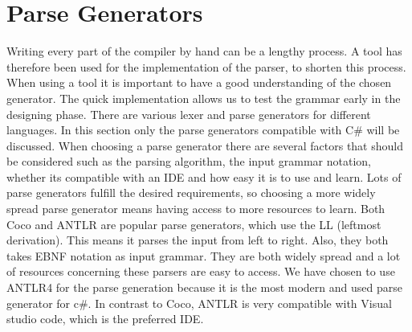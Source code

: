 \section{Parse Generators}
Writing every part of the compiler by hand can be a lengthy process. A tool has therefore been used for the implementation of the parser, to shorten this process. When using a tool it is important to have a good understanding of the chosen generator. The quick implementation allows us to test the grammar early in the designing phase.
There are various lexer and parse generators for different languages. In this section only the parse generators compatible with C# 
will be discussed. When choosing a parse generator there are several factors that should be considered such as the parsing algorithm, the input grammar notation,
whether its compatible with an IDE and how easy it is to use and learn. Lots of parse generators fulfill the desired requirements, 
so choosing a more widely spread parse generator means having access to more resources to learn. Both Coco and ANTLR are popular parse generators, which use the LL (leftmost derivation). This means it parses the input from left to right. 
Also, they both takes EBNF notation as input grammar. They are both widely spread and a lot of resources concerning these parsers are easy to access. \newline
We have chosen to use ANTLR4 for the parse generation because it is the most modern and used parse generator for c#. In contrast to Coco, ANTLR is very compatible with Visual studio code, which is the preferred IDE. 
